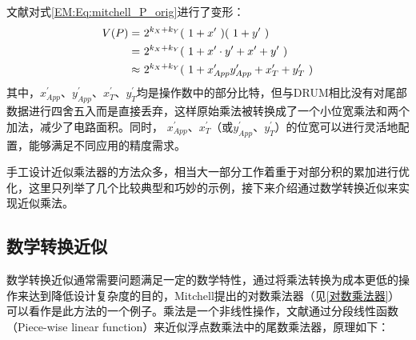 文献\cite{AC:AM:TOSAM}对式\eqref{EM:Eq:mitchell_P_orig}进行了变形：
\begin{align}
    V(P) = & \ 2^{k_X + k_Y} ( \ 1 + x^{\prime} \ ) ( \ 1 + y^{\prime} \ ) \notag \\
         = & \ 2^{k_X + k_Y} ( \ 1 + x^{\prime} \cdot y^{\prime} + x^{\prime} + y^{\prime} \ ) \notag \\
         \approx & \ 2^{k_X + k_Y} ( \ 1 + x^{\prime}_{App} y^{\prime}_{App} + x^{\prime}_T + y^{\prime}_T \ )
\label{AC:AM:Eq:TOSAM}
\end{align}
其中，$x^{\prime}_{App}$、$y^{\prime}_{App}$、$x^{\prime}_T$、$y^{\prime}_T$均是操作数中的部分比特，但与DRUM相比没有对尾部数据进行四舍五入而是直接丢弃，这样原始乘法被转换成了一个小位宽乘法和两个加法，减少了电路面积。同时，
$x^{\prime}_{App}$、$x^{\prime}_T$（或$y^{\prime}_{App}$、$y^{\prime}_T$）的位宽可以进行灵活地配置，能够满足不同应用的精度需求。

手工设计近似乘法器的方法众多，相当大一部分工作着重于对部分积的累加进行优化，这里只列举了几个比较典型和巧妙的示例，接下来介绍通过数学转换近似来实现近似乘法。

\subsection{数学转换近似}

数学转换近似通常需要问题满足一定的数学特性，通过将乘法转换为成本更低的操作来达到降低设计复杂度的目的，Mitchell提出的对数乘法器\cite{EM:mitchell}（见\ref{对数乘法器}）可以看作是此方法的一个例子。乘法是一个非线性操作，文献\cite{AC:AM:OU}通过分段线性函数（Piece-wise linear function）来近似浮点数乘法中的尾数乘法器，原理如下：

